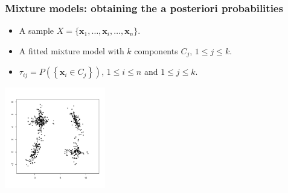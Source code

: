 \begin{frame}
\frametitle{Mixture models: obtaining the a posteriori probabilities}
\begin{itemize}
\item A sample $X= \{\textbf{x}_1, \dots, \textbf{x}_i, \dots, \textbf{x}_n\}$.
\item<2-> A fitted mixture model with $k$ components $C_j$, $1 \leq j \leq k$.
\item<3-> $\tau_{ij} = P( \left\{ \textbf{x}_i \in C_j \right\})$, $1 \leq i \leq n$ and $1 \leq j \leq k$.
\end{itemize}
\includegraphics[width=0.33\textwidth]{data41.pdf}
\end{frame}

